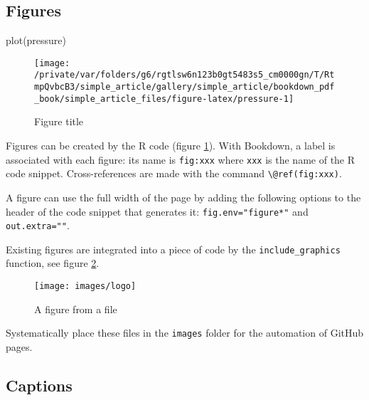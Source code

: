 \documentclass[fleqn,]{article} %
\newenvironment{Shaded}{\begin{snugshade}}{\end{snugshade}}
\newcommand{\FunctionTok}[1]{\textcolor[rgb]{0.00,0.00,0.00}{{#1}}}
\newcommand{\NormalTok}[1]{{#1}}
\begin{document}
\subsection{Figures}\label{figures}

\scriptsize

\begin{Shaded}
\begin{Highlighting}[]
\FunctionTok{plot}\NormalTok{(pressure)}
\end{Highlighting}
\end{Shaded}

\begin{figure}

{\centering \texttt{[image: /private/var/folders/g6/rgtlsw6n123b0gt5483s5\_cm0000gn/T/RtmpQvbcB3/simple\_article/gallery/simple\_article/bookdown\_pdf\_book/simple\_article\_files/figure-latex/pressure-1]} 

}

\caption{Figure title}\label{fig:pressure}
\end{figure}

\normalsize

Figures can be created by the R code (figure \ref{fig:pressure}).
With Bookdown, a label is associated with each figure: its name is \texttt{fig:xxx} where \texttt{xxx} is the name of the R code snippet.
Cross-references are made with the command \texttt{\textbackslash{}@ref(fig:xxx)}.

A figure can use the full width of the page by adding the following options to the header of the code snippet that generates it: \texttt{fig.env="figure*"} and \texttt{out.extra=""}.

Existing figures are integrated into a piece of code by the \texttt{include\_graphics} function, see figure \ref{fig:logo}.

\scriptsize

\begin{figure}

{\centering \texttt{[image: images/logo]} 

}

\caption{A figure from a file}\label{fig:logo}
\end{figure}

\normalsize

Systematically place these files in the \texttt{images} folder for the automation of GitHub pages.

\subsection{Captions}\label{captions}
\end{document}
